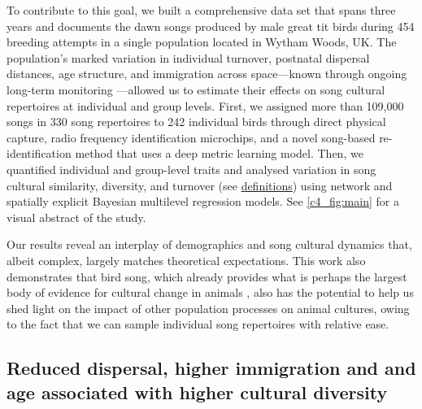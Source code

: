 \documentclass[9pt, onecolumn, twoside, lineno]{gsajnl}
\begin{document}
To contribute to this goal, we built a comprehensive data set that spans three years and documents the dawn songs produced by male great tit birds during 454 breeding attempts in a single population located in Wytham Woods, UK. The population's marked variation in individual turnover, postnatal dispersal distances, age structure, and immigration across space---known through ongoing long-term monitoring \autocite{lack1964}---allowed us to estimate their effects on song cultural repertoires at individual and group levels. First, we assigned more than 109,000 songs in 330 song repertoires to 242 individual birds through direct physical capture, radio frequency identification microchips, and a novel song-based re-identification method that uses a deep metric learning model. Then, we quantified individual and group-level traits and analysed variation in song cultural similarity, diversity, and turnover (see \hyperref[sc:group-properties]{definitions}) using network and spatially explicit Bayesian multilevel regression models. See \autoref{c4_fig:main} for a visual abstract of the study.




Our results reveal an interplay of demographics and song cultural dynamics that, albeit complex, largely matches theoretical expectations. This work also demonstrates that bird song, which already provides what is perhaps the largest body of evidence for cultural change in animals \autocite{laland2006}, also has the potential to help us shed light on the impact of other population processes on animal cultures, owing to the fact that we can sample individual song repertoires with relative ease.

\subsection{Reduced dispersal, higher immigration and and age associated with higher cultural diversity}
\end{document}

